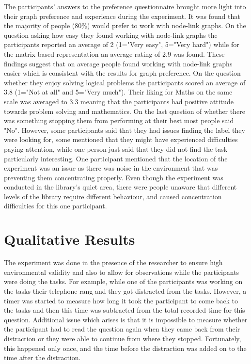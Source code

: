 \documentclass{l4proj}
\begin{document}
The participants' answers to the preference questionnaire brought more light into their graph preference and experience during the experiment. It was found that the majority of people (80\%) would prefer to work with node-link graphs. On the question asking how easy they found working with node-link graphs the participants reported an average of 2 (1="Very easy", 5="Very hard") while for the matrix-based representation an average rating of 2.9 was found. These findings suggest that on average people found working with node-link graphs easier which is consistent with the results for graph preference. On the question whether they enjoy solving logical problems the participants scored an average of 3.8 (1="Not at all" and 5="Very much"). Their liking for Maths on the same scale was averaged to 3.3 meaning that the participants had positive attitude towards problem solving and mathematics. On the last question of whether there was something stopping them from performing at their best most people said "No". However, some participants said that they had issues finding the label they were looking for, some mentioned that they might have experienced difficulties paying attention, while one person just said that they did not find the task particularly interesting. One participant mentioned that the location of the experiment was an issue as there was noise in the environment that was preventing them concentrating properly. Even though the experiment was conducted in the library's quiet area, there were people unaware that different levels of the library require different behaviour, and caused concentration difficulties for this one participant.


\section{Qualitative Results}

The experiment was done in the presence of the researcher to ensure high environmental validity and also to allow for  observations while the participants were doing the tasks. For example, while one of the participants was working on the tasks their telephone rang and they got distracted from the tasks. However, a timer was started to measure how long it took the participant to come back to the tasks and then this time was subtracted from the total recorded time for this question. Additional issue which arises is that it is impossible to measure whether the participant had to read the question again when they came back from their distraction or they were able to continue from where they stopped. Fortunately, this happened only once, and the time before the distraction was added on to the time after the distraction.
\end{document}
